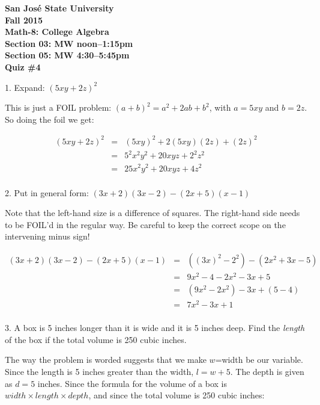 \documentclass[letterpaper, 12pt]{article}
\begin{document}
\begin{center}
\bfseries
San Jos\'{e} State University \\
Fall 2015 \\
Math-8: College Algebra \\
Section 03: MW noon--1:15pm \\
Section 05: MW 4:30--5:45pm \\
\bigskip
Quiz \#4
\end{center}

\bigskip

1. Expand: $(5xy+2z)^2$

\bigskip

This is just a FOIL problem: $(a+b)^2=a^2+2ab+b^2$, with $a=5xy$ and $b=2z$. So
doing the foil we get:

\begin{eqnarray*}
(5xy+2z)^2 &=& (5xy)^2+2(5xy)(2z)+(2z)^2 \\
           &=& 5^2x^2y^2+20xyz+2^2z^2 \\
           &=& 25x^2y^2+20xyz+4z^2 \\
\end{eqnarray*}

2. Put in general form: $(3x+2)(3x-2)-(2x+5)(x-1)$

Note that the left-hand size is a difference of squares.  The right-hand side
needs to be FOIL'd in the regular way. Be careful to keep the correct scope on
the intervening minus sign!

\begin{eqnarray*}
(3x+2)(3x-2)-(2x+5)(x-1) &=& ((3x)^2-2^2)-(2x^2+3x-5) \\
                         &=& 9x^2-4-2x^2-3x+5 \\
                         &=& (9x^2-2x^2)-3x+(5-4) \\
                         &=& 7x^2-3x+1 \\
\end{eqnarray*}

3. A box is 5 inches longer than it is wide and it is 5 inches deep. Find the
\emph{length} of the box if the total volume is 250 cubic inches.

\bigskip

The way the problem is worded suggests that we make $w$=width be our variable.
Since the length is 5 inches greater than the width, $l=w+5$.  The depth is
given as $d=5$ inches.  Since the formula for the volume of a box is
$width\times length\times depth$, and since the total volume is 250 cubic
inches:
\end{document}
